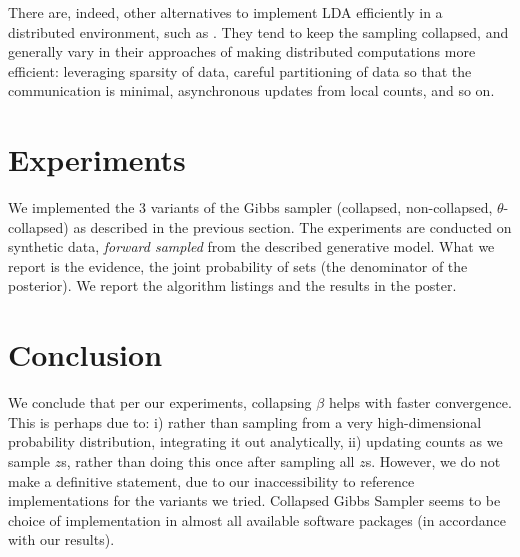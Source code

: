 \documentclass{article}%
\begin{document}
There are, indeed, other alternatives to implement LDA efficiently in a distributed environment, such as \cite{newman2009distributed, smyth2009asynchronous}. They tend to keep the sampling collapsed, and generally vary in their approaches of making distributed computations more efficient: leveraging sparsity of data, careful partitioning of data so that the communication is minimal,  asynchronous updates from local counts, and so on. 


\section{Experiments}
We implemented the 3 variants of the Gibbs sampler (collapsed, non-collapsed, $\theta$-collapsed) as described in the previous section. The experiments are conducted on synthetic data, \textit{forward sampled} from the described generative model. What we report is the evidence, the joint probability of sets (the denominator of the posterior). We report the algorithm listings and the results in the poster. 

\section{Conclusion}
We conclude that per our experiments, collapsing $\beta$ helps with faster convergence. This is perhaps due to: i) rather than sampling from a very high-dimensional probability distribution, integrating it out analytically, ii) updating counts as we sample $z$s, rather than doing this once after sampling all $z$s. However, we do not make a definitive statement, due to our inaccessibility to reference implementations for the variants we tried. Collapsed Gibbs Sampler seems to be choice of implementation in almost all available software packages (in accordance with our results).



\end{document}
